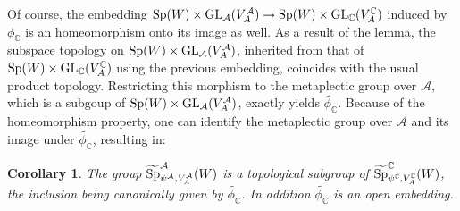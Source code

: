 \documentclass[11pt]{article}
\theoremstyle{plain}
\newtheorem{cor}[theo]{Corollary}
\theoremstyle{definition}
\theoremstyle{plain}
\theoremstyle{definition}
\theoremstyle{plain}
\begin{document}
Of course, the embedding $\textup{Sp}(W) \times \textup{GL}_\mathcal{A}(V_A^\mathcal{A}) \to \textup{Sp}(W) \times \textup{GL}_\mathbb{C}(V_A^\mathbb{C})$ induced by $\phi_\mathbb{C}$ is an homeomorphism onto its image as well. As a result of the lemma, the subspace topology on $\textup{Sp}(W) \times \textup{GL}_\mathcal{A}(V_A^\mathcal{A})$, inherited from that of $\textup{Sp}(W) \times \textup{GL}_\mathbb{C}(V_A^\mathbb{C})$ using the previous embedding, coincides with the usual product topology. Restricting this morphism to the metaplectic group over $\mathcal{A}$, which is a subgoup of $\textup{Sp}(W) \times \textup{GL}_\mathcal{A}(V_A^\mathcal{A})$, exactly yields $\widetilde{\phi_\mathbb{C}}$. Because of the homeomorphism property, one can identify the metaplectic group over $\mathcal{A}$ and its image under $\widetilde{\phi_\mathbb{C}}$, resulting in:

\begin{cor} \label{met_gp_over_A_over_C_cor} The group $\widetilde{\textup{Sp}}_{\psi^\mathcal{A},V_A^\mathcal{A}}^\mathcal{A}(W)$ is a topological subgroup of $\widetilde{\textup{Sp}}_{\psi^\mathbb{C},V_A^\mathbb{C}}^\mathbb{C}(W)$, the inclusion being canonically given by $\widetilde{\phi_\mathbb{C}}$. In addition $\widetilde{\phi_\mathbb{C}}$ is an open embedding. \end{cor}
\end{document}
